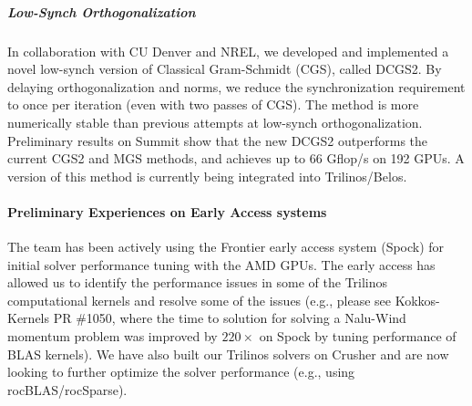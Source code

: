 
\subparagraph{Low-Synch Orthogonalization} In collaboration with CU Denver and NREL, we developed and implemented a novel low-synch version of Classical Gram-Schmidt (CGS), called DCGS2. By delaying orthogonalization and norms, we reduce the synchronization requirement to once per iteration (even with two passes of CGS). The method is more numerically stable than previous attempts at low-synch orthogonalization. Preliminary results on Summit show that the new DCGS2 outperforms the current CGS2 and MGS methods, and achieves up to 66 Gflop/s on 192 GPUs. A version of this method is currently being integrated into Trilinos/Belos.

\paragraph{Preliminary Experiences on Early Access systems}

The team has been actively using the Frontier early access system (Spock) for initial solver performance tuning with the AMD GPUs.
The early access has allowed us to identify the performance issues in some of the Trilinos computational kernels
and resolve some of the issues
(e.g., please see Kokkos-Kernels PR \#1050, where the time to solution
for solving a Nalu-Wind momentum problem was improved by $220\times$
on Spock by tuning performance of BLAS kernels).
We have also built our Trilinos solvers on Crusher and are now looking to
further optimize the solver performance (e.g., using rocBLAS/rocSparse).


